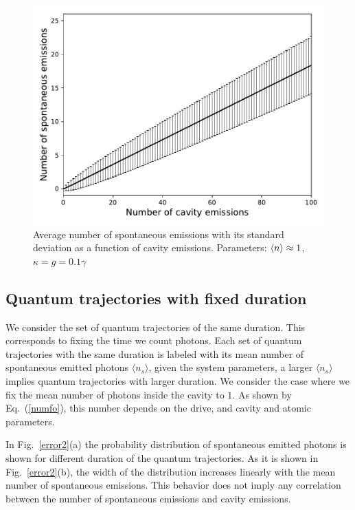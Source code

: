\documentclass[%
 reprint,
 amsmath,amssymb,
 aps, 
]{revtex4-1}
\begin{document}
\begin{figure}[!h]  
\centering
\includegraphics[scale = 0.5]{newsigma1.pdf}
\caption{Average number of spontaneous emissions with its standard
  deviation as a function of cavity emissions. Parameters: $\expval{n} \approx 1$, $\kappa = g = 0.1\gamma$}
\label{graph}
\end{figure} 




\subsection{Quantum trajectories with fixed duration}
We consider the set of quantum trajectories of the same duration. This
corresponds to fixing the time we count photons. Each set of quantum
trajectories with the same duration is labeled with its mean number
of spontaneous emitted photons $\langle n_s\rangle$, given the system
parameters, a larger $\langle n_s\rangle$ implies quantum trajectories
with larger duration. We consider the case where we fix the mean
number of photons inside the cavity to $1$. As shown by
Eq.~(\ref{numfo}), this number depends on the drive, and cavity and
atomic parameters.

In Fig.~\ref{error2}(a) the probability distribution of spontaneous
emitted photons is shown for different duration of the quantum
trajectories. As it is shown in Fig.~\ref{error2}(b), the width of the
distribution increases linearly with the mean number of spontaneous
emissions. This behavior does not imply any correlation between the
number of spontaneous emissions and cavity emissions.
\end{document}
